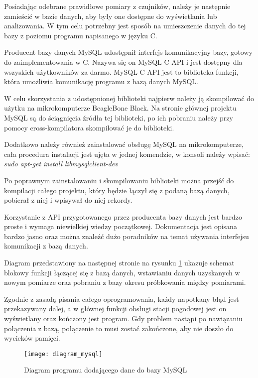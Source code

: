 Posiadając odebrane prawidłowe pomiary z czujników, należy je następnie zamieścić w bazie danych, aby były one dostępne do wyświetlania lub analizowania. W tym celu potrzebny jest sposób na umieszczenie danych do tej bazy z poziomu programu napisanego w języku C.

Producent bazy danych MySQL udostępnił interfejs komunikacyjny bazy, gotowy do zaimplementowania w C. Nazywa się on MySQL C API i jest dostępny dla wszyskich użytkowników za darmo. MySQL C API jest to biblioteka funkcji, która umożliwia komunikację programu z bazą danych MySQL.

W celu skorzystania z udostępnionej biblioteki najpierw należy ją skompilować do użytku na mikrokomputerze BeagleBone Black. Na stronie głównej projektu MySQL są do ściągnięcia źródła tej biblioteki, po ich pobraniu należy przy pomocy cross-kompilatora skompilować je do biblioteki.

Dodatkowo należy również zainstalować obsługę MySQL na mikrokomputerze, cała procedura instalacji jest ujęta w jednej komendzie, w konsoli należy wpisać:\newline
\emph{sudo apt-get install libmysqlclient-dev}

Po poprawnym zainstalowaniu i skompilowaniu biblioteki można przejść do kompilacji całego projektu, który będzie łączył się z podaną bazą danych, pobierał z niej i wpisywał do niej rekordy.

Korzystanie z API przygotowanego przez producenta bazy danych jest bardzo proste i wymaga niewielkiej wiedzy początkowej. Dokumentacja jest opisana bardzo jasno oraz można znaleźć dużo poradników na temat używania interfejsu komunikacji z bazą danych.

Diagram przedstawiony na następnej stronie na rysunku \ref{fig:diagram_mysql} ukazuje schemat blokowy funkcji łączącej się z bazą danych, wstawianiu danych uzyskanych w nowym pomiarze oraz pobraniu z bazy okresu próbkowania między pomiarami.

Zgodnie z zasadą pisania całego oprogramowania, każdy napotkany błąd jest przekazywany dalej, a w głównej funkcji obsługi stacji pogodowej jest on wyświetlany oraz kończony jest program. Gdy problem nastąpi po nawiązaniu połączenia z bazą, połączenie to musi zostać zakończone, aby nie doszło do wycieków pamięci.

\begin{figure}[h]
\centering
\texttt{[image: diagram\_mysql]}
\caption{Diagram programu dodającego dane do bazy MySQL}
\label{fig:diagram_mysql}
\end{figure}
